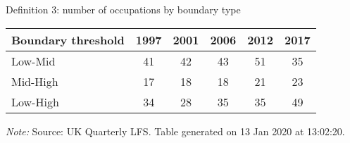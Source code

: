 \begin{center}
\begin{threeparttable}[!h]
\caption{Definition 3: number of occupations by boundary type}
\label{tab:shareBound}
\begin{tabular}{lccccc}
\toprule
\toprule
\textbf{Boundary threshold}&\multicolumn{1}{c}{\textbf{1997}}&\multicolumn{1}{c}{\textbf{2001}}&\multicolumn{1}{c}{\textbf{2006}}&\multicolumn{1}{c}{\textbf{2012}}&\multicolumn{1}{c}{\textbf{2017}} \\
\midrule
Low-Mid     &          41&          42&          43&          51&          35\\
Mid-High    &          17&          18&          18&          21&          23\\
Low-High    &          34&          28&          35&          35&          49\\
\bottomrule
\bottomrule
\end{tabular}
\begin{tablenotes}
\item\footnotesize\textit{Note:} Source: UK Quarterly LFS. Table generated on 13 Jan 2020 at 13:02:20.
\end{tablenotes}
\end{threeparttable}
\end{center}
